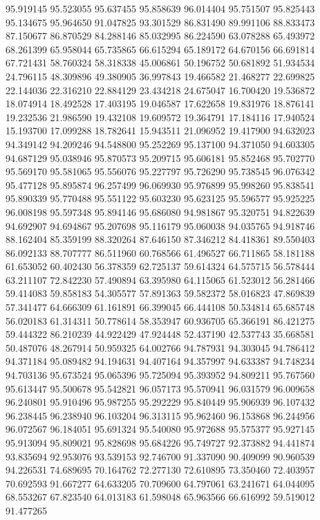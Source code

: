 95.919145
95.523055
95.637455
95.858639
96.014404
95.751507
95.825443
95.134675
95.964650
91.047825
93.301529
86.831490
89.991106
88.833473
87.150677
86.870529
84.288146
85.032995
86.224590
63.078288
65.493972
68.261399
65.958044
65.735865
66.615294
65.189172
64.670156
66.691814
67.721431
58.760324
58.318338
45.006861
50.196752
50.681892
51.934534
24.796115
48.309896
49.380905
36.997843
19.466582
21.468277
22.699825
22.144036
22.316210
22.884129
23.434218
24.675047
16.700420
19.536872
18.074914
18.492528
17.403195
19.046587
17.622658
19.831976
18.876141
19.232536
21.986590
19.432108
19.609572
19.364791
17.184116
17.940524
15.193700
17.099288
18.782641
15.943511
21.096952
19.417900
94.632023
94.349142
94.209246
94.548800
95.252269
95.137100
94.371050
94.603305
94.687129
95.038946
95.870573
95.209715
95.606181
95.852468
95.702770
95.569170
95.581065
95.556076
95.227797
95.726290
95.738545
96.076342
95.477128
95.895874
96.257499
96.069930
95.976899
95.998260
95.838541
95.890339
95.770488
95.551122
95.603230
95.623125
95.596577
95.925225
96.008198
95.597348
95.894146
95.686080
94.981867
95.320751
94.822639
94.692907
94.694867
95.207698
95.116179
95.060038
94.035765
94.918746
88.162404
85.359199
88.320264
87.646150
87.346212
84.418361
89.550403
86.092133
88.707777
86.511960
60.768566
61.496527
66.711865
58.181188
61.653052
60.402430
56.378359
62.725137
59.614324
64.575715
56.578444
63.211107
72.842230
57.490894
63.395980
64.115065
61.523012
56.281466
59.414083
59.858183
54.305577
57.891363
59.582372
58.016823
47.869839
57.341477
64.666309
61.161891
66.399045
66.444108
50.534814
65.685748
56.020183
61.314311
50.778614
58.353947
60.936705
65.366191
86.421275
59.444322
86.210239
44.922429
47.924448
52.437190
42.537743
35.668581
50.487076
48.267914
50.959325
64.002766
94.787931
94.303045
94.786412
94.371184
95.089482
94.194631
94.407164
94.357997
94.633387
94.748234
94.703136
95.673524
95.065396
95.725094
95.393952
94.809211
95.767560
95.613447
95.500678
95.542821
96.057173
95.570941
96.031579
96.009658
96.240801
95.910496
95.987255
95.292229
95.840449
95.906939
96.107432
96.238445
96.238940
96.103204
96.313115
95.962460
96.153868
96.244956
96.072567
96.184051
95.691324
95.540080
95.972688
95.575377
95.927145
95.913094
95.809021
95.828698
95.684226
95.749727
92.373882
94.441874
93.835694
92.953076
93.539153
92.746700
91.337090
90.409099
90.960539
94.226531
74.689695
70.164762
72.277130
72.610895
73.350460
72.403957
70.692593
91.667277
64.633205
70.709600
64.797061
63.241671
64.044095
68.553267
67.823540
64.013183
61.598048
65.963566
66.616992
59.519012
91.477265
